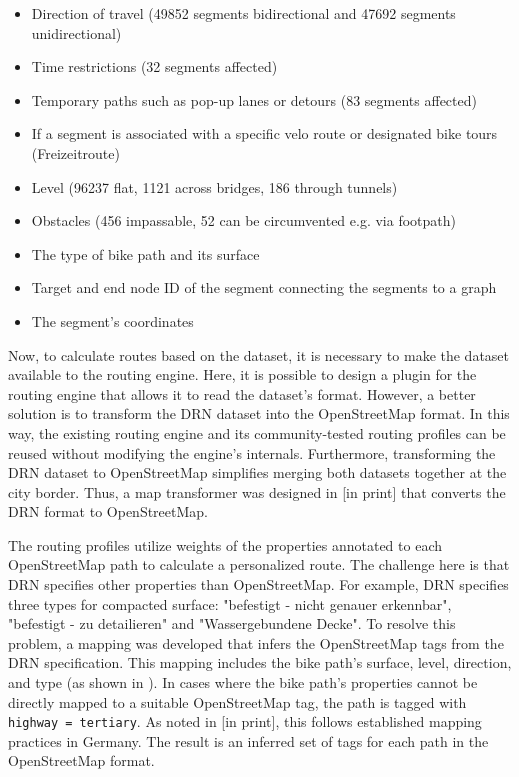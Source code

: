 \begin{itemize}
    \item Direction of travel (49852 segments bidirectional and 47692 segments unidirectional)
    \item Time restrictions (32 segments affected)
    \item Temporary paths such as pop-up lanes or detours (83 segments affected)
    \item If a segment is associated with a specific velo route or designated bike tours (Freizeitroute)
    \item Level (96237 flat, 1121 across bridges, 186 through tunnels)
    \item Obstacles (456 impassable, 52 can be circumvented e.g. via footpath)
    \item The type of bike path and its surface
    \item Target and end node ID of the segment connecting the segments to a graph
    \item The segment's coordinates
\end{itemize}

Now, to calculate routes based on the dataset, it is necessary to make the dataset available to the routing engine. Here, it is possible to design a plugin for the routing engine that allows it to read the dataset's format. However, a better solution is to transform the DRN dataset into the OpenStreetMap format. In this way, the existing routing engine and its community-tested routing profiles can be reused without modifying the engine's internals. Furthermore, transforming the DRN dataset to OpenStreetMap simplifies merging both datasets together at the city border. Thus, a map transformer was designed in [in print] that converts the DRN format to OpenStreetMap.

The routing profiles utilize weights of the properties annotated to each OpenStreetMap path to calculate a personalized route. The challenge here is that DRN specifies other properties than OpenStreetMap. For example, DRN specifies three types for compacted surface: "befestigt - nicht genauer erkennbar", "befestigt - zu detailieren" and "Wassergebundene Decke". To resolve this problem, a mapping was developed that infers the OpenStreetMap tags from the DRN specification. This mapping includes the bike path's surface, level, direction, and type (as shown in ). In cases where the bike path's properties cannot be directly mapped to a suitable OpenStreetMap tag, the path is tagged with \texttt{highway = tertiary}. As noted in [in print], this follows established mapping practices in Germany. The result is an inferred set of tags for each path in the OpenStreetMap format.

